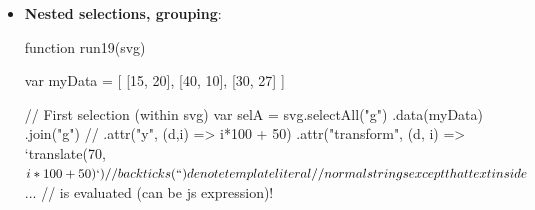 \documentclass{report}
\begin{document}
\begin{itemize}
\begin{itemize}
                \item Element 3 now represents 1
            \end{itemize}
            With $d \implies d$,  
            \begin{itemize}
                \item Element with key 3 already exists $\to$ move/update
                \item Element with key 2 $\to $ unchanged
                \item Element with key 1 $\to$ move/update
            \end{itemize}
        \item \textbf{Nested selections, grouping}: 
            \bigbreak \noindent 
            \begin{jscode}
                function run19(svg) {
                  var myData = [
                    [15, 20],
                    [40, 10],
                    [30, 27]
                  ]

                  // First selection (within svg)
                  var selA = svg.selectAll("g")
                    .data(myData)
                    .join("g")
                    // .attr("y", (d,i) => i*100 + 50)
                    .attr("transform", (d, i) => `translate(70,${i*100+50})`)
                    // backticks (``) denote template literal
                    // normal strings except that text inside ${...}
                    // is evaluated (can be js expression)!

}
\end{jscode}
\end{itemize}
\end{document}
